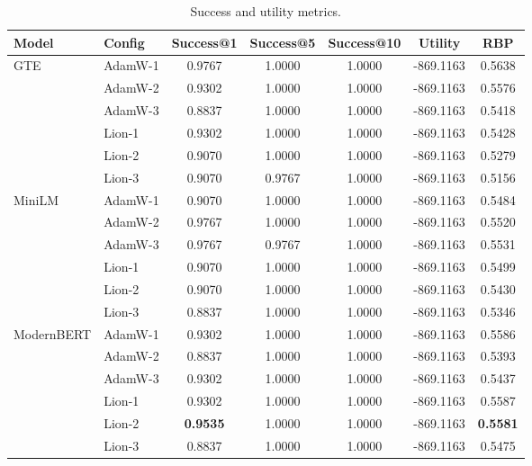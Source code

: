 \begin{table}[t]
\centering
\caption{Success and utility metrics.}
\label{tab:success_metrics}
\small
\begin{tabular}{llccccc}
\toprule
\textbf{Model} & \textbf{Config} & \textbf{Success@1} & \textbf{Success@5} & \textbf{Success@10} & \textbf{Utility} & \textbf{RBP} \\
\midrule
\multirow{6}{*}{GTE} & AdamW-1 & 0.9767 & 1.0000 & 1.0000 & -869.1163 & 0.5638 \\
 & AdamW-2 & 0.9302 & 1.0000 & 1.0000 & -869.1163 & 0.5576 \\
 & AdamW-3 & 0.8837 & 1.0000 & 1.0000 & -869.1163 & 0.5418 \\
 & Lion-1 & 0.9302 & 1.0000 & 1.0000 & -869.1163 & 0.5428 \\
 & Lion-2 & 0.9070 & 1.0000 & 1.0000 & -869.1163 & 0.5279 \\
 & Lion-3 & 0.9070 & 0.9767 & 1.0000 & -869.1163 & 0.5156 \\
\midrule
\multirow{6}{*}{MiniLM} & AdamW-1 & 0.9070 & 1.0000 & 1.0000 & -869.1163 & 0.5484 \\
 & AdamW-2 & 0.9767 & 1.0000 & 1.0000 & -869.1163 & 0.5520 \\
 & AdamW-3 & 0.9767 & 0.9767 & 1.0000 & -869.1163 & 0.5531 \\
 & Lion-1 & 0.9070 & 1.0000 & 1.0000 & -869.1163 & 0.5499 \\
 & Lion-2 & 0.9070 & 1.0000 & 1.0000 & -869.1163 & 0.5430 \\
 & Lion-3 & 0.8837 & 1.0000 & 1.0000 & -869.1163 & 0.5346 \\
\midrule
\multirow{6}{*}{ModernBERT} & AdamW-1 & 0.9302 & 1.0000 & 1.0000 & -869.1163 & 0.5586 \\
 & AdamW-2 & 0.8837 & 1.0000 & 1.0000 & -869.1163 & 0.5393 \\
 & AdamW-3 & 0.9302 & 1.0000 & 1.0000 & -869.1163 & 0.5437 \\
 & Lion-1 & 0.9302 & 1.0000 & 1.0000 & -869.1163 & 0.5587 \\
 & Lion-2 & \textbf{0.9535} & 1.0000 & 1.0000 & -869.1163 & \textbf{0.5581} \\
 & Lion-3 & 0.8837 & 1.0000 & 1.0000 & -869.1163 & 0.5475 \\
\bottomrule
\end{tabular}
\end{table}



